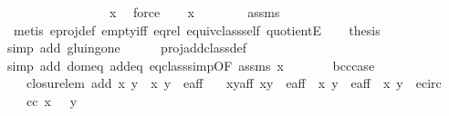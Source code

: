\begin{isabellebody}
\ \ \ \ \ \ \ \ \ \ \ \ \ \ \ \ x{\isachardoublequoteclose}\ \isamarkupfalse%
\ force\isanewline
\ \ \isamarkupfalse%
\ {\isachardoublequoteopen}x\ {\isasymnoteq}\ {\isacharbraceleft}{\isacharbraceright}{\isachardoublequoteclose}\isanewline
\ \ \ \ \isamarkupfalse%
\ assms\isanewline
\ \ \ \ \isamarkupfalse%
\ {\isacharparenleft}metis\ e{\isacharunderscore}proj{\isacharunderscore}def\ empty{\isacharunderscore}iff\ eq{\isacharunderscore}rel\ equiv{\isacharunderscore}class{\isacharunderscore}self\ quotientE{\isacharparenright}\isanewline
\ \ \isamarkupfalse%
\ {\isacharquery}thesis\isanewline
\ \ \ \ \isamarkupfalse%
{\isacharparenleft}simp\ add{\isacharcolon}\ gluing{\isacharunderscore}one{\isacharparenright}\isanewline
\ \ \ \ \isamarkupfalse%
\ proj{\isacharunderscore}add{\isacharunderscore}class{\isacharunderscore}def\isanewline
\ \ \ \ \isamarkupfalse%
{\isacharparenleft}simp\ add{\isacharcolon}\ dom{\isacharunderscore}eq\ add{\isacharunderscore}eq\ eq{\isacharunderscore}class{\isacharunderscore}simp{\isacharbrackleft}OF\ assms\ {\isacartoucheopen}x\ {\isasymnoteq}\ {\isacharbraceleft}{\isacharbraceright}{\isacartoucheclose}{\isacharbrackright}{\isacharparenright}\ \ \ \ \isanewline
{}\isamarkupfalse%
%
\endisatagproof
{\isafoldproof}%
%
\isadelimproof
\isanewline
%
\endisadelimproof
\isanewline
{}\isamarkupfalse%
\ b{\isacharunderscore}cc{\isacharunderscore}case{\isacharcolon}\isanewline
\ \ \ closure{\isacharunderscore}lem{\isacharcolon}\ {\isachardoublequoteopen}add\ {\isacharparenleft}x{\isacharcomma}\ y{\isacharparenright}\ {\isacharparenleft}{\isasymtau}\ {\isacharparenleft}x{\isacharprime}{\isacharcomma}\ y{\isacharprime}{\isacharparenright}{\isacharparenright}\ {\isasymin}\ e{\isacharunderscore}aff{\isachardoublequoteclose}\isanewline
\ \ \ x{\isacharunderscore}y{\isacharunderscore}aff{\isacharcolon}\ {\isachardoublequoteopen}{\isacharparenleft}x{\isacharcomma}y{\isacharparenright}\ {\isasymin}\ e{\isacharunderscore}aff{\isachardoublequoteclose}\ {\isachardoublequoteopen}{\isasymtau}\ {\isacharparenleft}x{\isacharprime}{\isacharcomma}\ y{\isacharprime}{\isacharparenright}\ {\isasymin}\ e{\isacharunderscore}aff{\isachardoublequoteclose}\ {\isachardoublequoteopen}{\isasymtau}\ {\isacharparenleft}x{\isacharprime}{\isacharcomma}\ y{\isacharprime}{\isacharparenright}\ {\isasymin}\ e{\isacharunderscore}circ{\isachardoublequoteclose}\isanewline
\ \ \ cc{\isacharcolon}\ {\isachardoublequoteopen}x{\isacharprime}\ {\isasymnoteq}\ {}{\isachardoublequoteclose}\ {\isachardoublequoteopen}y{\isacharprime}\ {\isasymnoteq}\ {}{\isachardoublequoteclose}\isanewline

\end{isabellebody}
